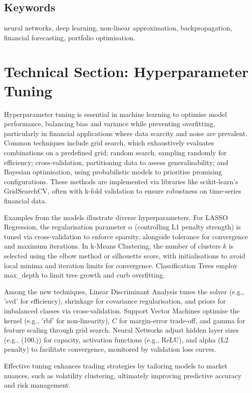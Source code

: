 \documentclass{article}
\begin{document}
\subsection{Keywords}

neural networks, deep learning, non-linear approximation, backpropagation, financial forecasting, portfolio optimisation.


\section{Technical Section: Hyperparameter Tuning}

Hyperparameter tuning is essential in machine learning to optimise model performance, balancing bias and variance while preventing overfitting, particularly in financial applications where data scarcity and noise are prevalent. Common techniques include grid search, which exhaustively evaluates combinations on a predefined grid; random search, sampling randomly for efficiency; cross-validation, partitioning data to assess generalisability; and Bayesian optimisation, using probabilistic models to prioritise promising configurations. These methods are implemented via libraries like scikit-learn's GridSearchCV, often with k-fold validation to ensure robustness on time-series financial data.

Examples from the models illustrate diverse hyperparameters. For LASSO Regression, the regularisation parameter \(\alpha\) (controlling L1 penalty strength) is tuned via cross-validation to enforce sparsity, alongside tolerance for convergence and maximum iterations. In k-Means Clustering, the number of clusters \(k\) is selected using the elbow method or silhouette score, with initialisations to avoid local minima and iteration limits for convergence. Classification Trees employ max\_depth to limit tree growth and curb overfitting.

Among the new techniques, Linear Discriminant Analysis tunes the solver (e.g., 'svd' for efficiency), shrinkage for covariance regularisation, and priors for imbalanced classes via cross-validation. Support Vector Machines optimise the kernel (e.g., 'rbf' for non-linearity), $C$ for margin-error trade-off, and gamma for feature scaling through grid search. Neural Networks adjust hidden layer sizes (e.g., (100,)) for capacity, activation functions (e.g., ReLU), and alpha (L2 penalty) to facilitate convergence, monitored by validation loss curves.

Effective tuning enhances trading strategies by tailoring models to market nuances, such as volatility clustering, ultimately improving predictive accuracy and risk management.
\end{document}
